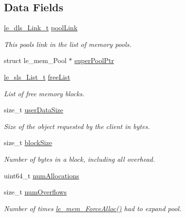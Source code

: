 \subsection*{Data Fields}
\begin{DoxyCompactItemize}
\item 
\hyperlink{structle__dls___link__t}{le\+\_\+dls\+\_\+\+Link\+\_\+t} \hyperlink{struct_mem_pool__t_a69728a565023b742041fc6229b5a48ab}{pool\+Link}
\begin{DoxyCompactList}\small\item\em This pool\textquotesingle{}s link in the list of memory pools. \end{DoxyCompactList}\item 
struct le\+\_\+mem\+\_\+\+Pool $\ast$ \hyperlink{struct_mem_pool__t_a91326c1c23490bd1319507914bf78e1c}{super\+Pool\+Ptr}
\item 
\hyperlink{structle__sls___list__t}{le\+\_\+sls\+\_\+\+List\+\_\+t} \hyperlink{struct_mem_pool__t_ab80c40cdb81eb35850058377a698c229}{free\+List}
\begin{DoxyCompactList}\small\item\em List of free memory blocks. \end{DoxyCompactList}\item 
size\+\_\+t \hyperlink{struct_mem_pool__t_a6b59b1da5f9951f750602bfe544d4b7e}{user\+Data\+Size}
\begin{DoxyCompactList}\small\item\em Size of the object requested by the client in bytes. \end{DoxyCompactList}\item 
size\+\_\+t \hyperlink{struct_mem_pool__t_a9b6fb86696cdc21313317f529e34a667}{block\+Size}
\begin{DoxyCompactList}\small\item\em Number of bytes in a block, including all overhead. \end{DoxyCompactList}\item 
uint64\+\_\+t \hyperlink{struct_mem_pool__t_ad695ba4571ede58f4b9c8d5ac5b5f29b}{num\+Allocations}
\item 
size\+\_\+t \hyperlink{struct_mem_pool__t_ac81f3a8d3e3828e17c1bc7b66fe7b9fb}{num\+Overflows}
\begin{DoxyCompactList}\small\item\em Number of times \hyperlink{le__mem_8h_af7c289c73d4182835a26a9099f3db359}{le\+\_\+mem\+\_\+\+Force\+Alloc()} had to expand pool. \end{DoxyCompactList}\item 

\end{DoxyCompactItemize}
